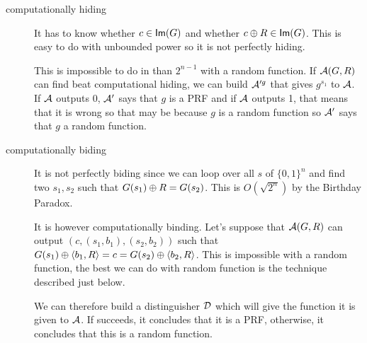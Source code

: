 \newape
\begin{solution}
  \begin{description}
    \item[computationally hiding]
      It has to know whether $c \in \operatorname{\mathsf{Im}}(G)$ and whether $c \oplus R \in \operatorname{\mathsf{Im}}(G)$.
      This is easy to do with unbounded power so it is not perfectly hiding.

      This is impossible to do in than $2^{n-1}$ with a random function.
      If $\mathcal{A}(G,R)$ can find beat computational hiding,
      we can build $\mathcal{A}'^g$ that gives $g^{s_1}$ to $\mathcal{A}$.
      If $\mathcal{A}$ outputs 0, $\mathcal{A}'$ says that $g$ is a PRF and if $\mathcal{A}$ outputs 1,
      that means that it is wrong so that may be because $g$ is a random function
      so $\mathcal{A}'$ says that $g$ a random function.
    \item[computationally biding]
      It is not perfectly biding since we can loop over all $s$ of $\{0,1\}^n$ and find two $s_1,s_2$ such
      that $G(s_1) \oplus R = G(s_2)$.
      This is $O(\sqrt{2^n})$ by the Birthday Paradox.

      It is however computationally binding.
      Let's suppose that $\mathcal{A}(G,R)$ can output $(c, (s_1,b_1), (s_2, b_2))$ such that
      $G(s_1) \oplus \langle b_1,R \rangle = c = G(s_2) \oplus \langle b_2,R \rangle$.
      This is impossible with a random function, the best we can do with random function is the technique described just below.

      We can therefore build a distinguisher $\mathcal{D}$ which will give the function it is given to $\mathcal{A}$.
      If succeeds, it concludes that it is a PRF, otherwise, it concludes that this is a random function.
  \end{description}
\end{solution}

